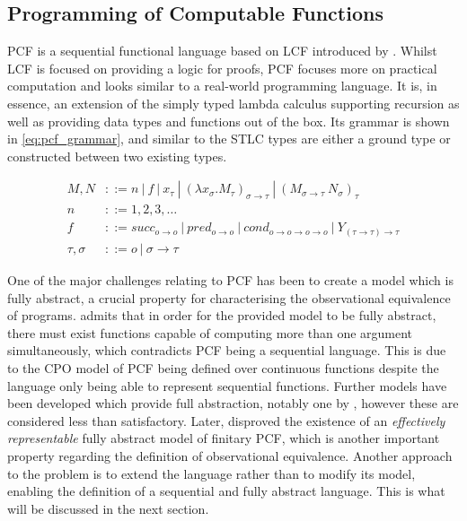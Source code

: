 \documentclass[12pt,a4paper]{report}
\theoremstyle{definition}
\theoremstyle{remark}
\begin{document}
\subsection{Programming of Computable Functions}
PCF is a sequential functional language based on LCF introduced by \cite{plotkin_1977}. Whilst LCF is focused on providing a logic for proofs, PCF focuses more on practical computation and looks similar to a real-world programming language. It is, in essence, an extension of the simply typed lambda calculus supporting recursion as well as providing data types and functions out of the box. Its grammar is shown in \eqref{eq:pcf_grammar}, and similar to the STLC types are either a ground type or constructed between two existing types.

\begin{equation} \label{eq:pcf_grammar}
\begin{split}
    M,N &::= n\ |\ f\ |\ x_{\tau}\ |\ (\lambda x_{\sigma} .M_{\tau})_{\sigma \rightarrow \tau}\ |\ (M_{\sigma \rightarrow \tau} \ N_{\sigma})_{\tau}\\
    n &::= 1, 2, 3, \dots\\
    f &::= succ_{o \rightarrow o} \ | \ pred_{o \rightarrow o} \ | \ cond_{o \rightarrow o \rightarrow o \rightarrow o} \ | \ Y_{(\tau \rightarrow \tau) \rightarrow \tau}\\
    \tau , \sigma &::= o\ |\ \sigma \rightarrow \tau
\end{split}
\end{equation}

One of the major challenges relating to PCF has been to create a model which is fully abstract, a crucial property for characterising the observational equivalence of programs. \cite{plotkin_1977} admits that in order for the provided model to be fully abstract, there must exist functions capable of computing more than one argument simultaneously, which contradicts PCF being a sequential language. This is due to the CPO model of PCF being defined over continuous functions despite the language only being able to represent sequential functions. Further models have been developed which provide full abstraction, notably one by \cite{milner_1977}, however these are considered less than satisfactory. Later, \cite{loader_1996} disproved the existence of an \textit{effectively representable} fully abstract model of finitary PCF, which is another important property regarding the definition of observational equivalence. Another approach to the problem is to extend the language rather than to modify its model, enabling the definition of a sequential and fully abstract language. This is what will be discussed in the next section.
\end{document}
